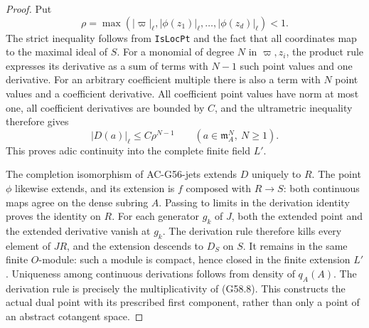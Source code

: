 \begin{proof}
Put
\[
          \rho=\max(|\varpi|_\ell,
                     |\phi(z_1)|_\ell,\ldots,
                     |\phi(z_d)|_\ell)<1 .
                                                               \tag{G58.11}
\]
The strict inequality follows from
\texttt{IsLocPt} and the fact that all
coordinates map to the maximal ideal of
$S$.  For a monomial of degree $N$ in
$\varpi,z_i$, the product rule expresses
its derivative as a sum of terms with
$N-1$ such point values and one derivative.
For an arbitrary coefficient multiple there
is also a term with $N$ point values and
a coefficient derivative.
All coefficient point values have norm at
most one, all coefficient derivatives are
bounded by $C$, and the ultrametric inequality
therefore gives
\[
              |D(a)|_\ell\leq C\rho^{N-1}
                    \qquad(a\in\mathfrak m_A^N,\ N\geq1).
                                                               \tag{G58.12}
\]
This proves adic continuity into the complete
finite field $L'$.

The completion isomorphism of AC-G56-jets
extends $D$ uniquely to $R$.
The point $\phi$ likewise extends, and its
extension is $f$ composed with $R\to S$:
both continuous maps agree on the dense
subring $A$.
Passing to limits in the derivation identity
proves the identity on $R$.
For each generator $g_k$ of $J$, both the
extended point and the extended derivative
vanish at $g_k$.
The derivation rule therefore kills every
element of $JR$, and the extension descends
to $D_S$ on $S$.
It remains in the same finite $O$-module:
such a module is compact, hence closed in
the finite extension $L'$.
Uniqueness among continuous derivations
follows from density of $q_A(A)$.
The derivation rule is precisely the
multiplicativity of (G58.8).
This constructs the actual dual point with
its prescribed first component, rather
than only a point of an abstract cotangent
space.
\end{proof}


